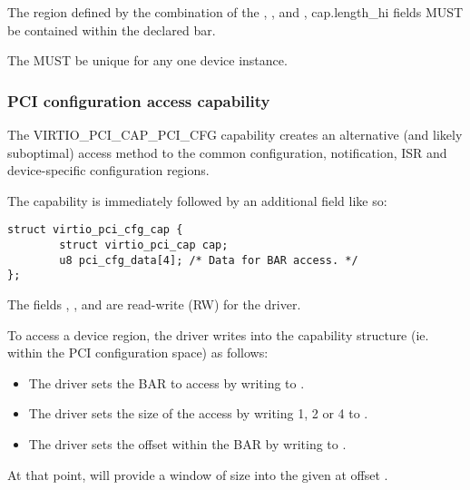 The region defined by the combination of the ,
, and , \field
{cap.length_hi} fields MUST be contained within the declared bar.

The  MUST be unique for any one device instance.

\subsubsection{PCI configuration access capability}\label{sec:Virtio Transport Options / Virtio Over PCI Bus / PCI Device Layout / PCI configuration access capability}

The VIRTIO_PCI_CAP_PCI_CFG capability
creates an alternative (and likely suboptimal) access method to the
common configuration, notification, ISR and device-specific configuration regions.

The capability is immediately followed by an additional field like so:

\begin{lstlisting}
struct virtio_pci_cfg_cap {
        struct virtio_pci_cap cap;
        u8 pci_cfg_data[4]; /* Data for BAR access. */
};
\end{lstlisting}

The fields , ,  and
 are read-write (RW) for the driver.

To access a device region, the driver writes into the capability
structure (ie. within the PCI configuration space) as follows:

\begin{itemize}
\item The driver sets the BAR to access by writing to .

\item The driver sets the size of the access by writing 1, 2 or 4 to
  .

\item The driver sets the offset within the BAR by writing to
  .
\end{itemize}

At that point,  will provide a window of size
 into the given  at offset .


